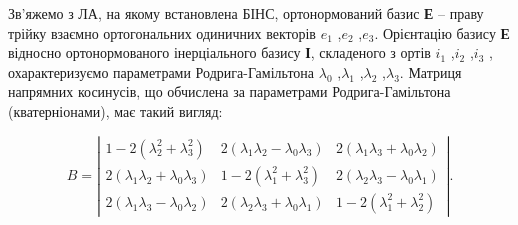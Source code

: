 Зв'яжемо з ЛА, на якому встановлена БІНС, ортонормований базис \textbf{Е} -- 
праву трійку взаємно ортогональних одиничних 
векторів $e_{1}$ ,$e_{2}$ ,$e_{3}$. Орієнтацію базису \textbf{Е} відносно ортонормованого 
інерціального базису \textbf{І}, складеного з ортів $i_{1}$ ,$i_{2}$ ,$i_{3}$ , охарактеризуємо 
параметрами Родрига-Гамільтона $\lambda_{0}$ ,$\lambda_{1}$ ,$\lambda_{2}$ ,$\lambda 
_{3}$. Матриця напрямних  косинусів, що обчислена за параметрами Родрига-Гамільтона 
(кватерніонами), має такий вигляд:

\[B=\left|
\begin{array}{ccc} {1-2(\lambda_{2}^{2} +\lambda_{3}^{2} )} & 
{2(\lambda_{1} \lambda_{2} -\lambda_{0} \lambda_{3} )} & 
{2(\lambda_{1} \lambda_{3} +\lambda_{0} \lambda_{2} )} \\ 
{2(\lambda_{1} \lambda_{2} +\lambda_{0} \lambda_{3} )} & 
{1-2(\lambda_{1}^{2} +\lambda_{3}^{2} )} & 
{2(\lambda_{2} \lambda_{3} -\lambda_{0} \lambda_{1} )} \\ 
{2(\lambda_{1} \lambda_{3} -\lambda_{0} \lambda_{2} )} & 
{2(\lambda_{2} \lambda_{3} +\lambda_{0} \lambda_{1} )} & 
{1-2(\lambda_{1}^{2} +\lambda_{2}^{2} )} \end{array}\right|.\] 

